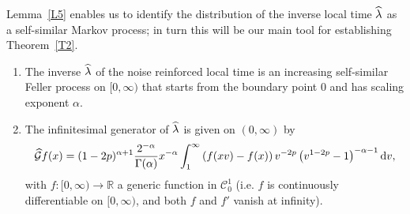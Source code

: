 \documentclass[10pt]{amsart}
\theoremstyle{definition}\newtheorem{defi}[theo]{Definition}\newtheorem{rema}[theo]{Remark}\newtheorem{exam}[theo]{Example}\newtheorem{exem}[theo]{Example}\newtheorem{nota}[theo]{Notation}
\renewcommand{\hat}[1]{\widehat{#1}}
\newcommand{\dd}{\mathrm{d}}
\newcommand{\R}{\mathbb{R}}
\newcommand{\calC}{\mathcal{C}}
\newcommand{\calG}{\mathcal{G}}
\newcommand*{\romanenumi}{\renewcommand*{\theenumi}{\roman{enumi}}}
\let\oldhat\hat
\renewcommand*{\hat}[1]{\mathchoice{\widehat{#1}}{\widehat{#1}}{\oldhat{#1}}{\oldhat{#1}}}
\begin{document}
Lemma~\ref{L5} enables us to identify the distribution of the inverse local time $\hat \lambda$ as a self-similar Markov process; in turn this will be our main tool for establishing Theorem~\ref{T2}.

\begin{coro}\label{C1}\leavevmode
\begin{enumerate}\romanenumi
\item\label{coro4.2.i} The inverse $\hat \lambda$ of the noise reinforced local time is an increasing self-similar Feller process on $[0,\infty)$ that starts from the boundary point $0$ and has scaling exponent $\alpha$.

\item\label{coro4.2.ii} The infinitesimal generator of $\hat \lambda$ is given on $(0,\infty)$ by
\[
\hat{\calG}f(x) = (1-2p)^{\alpha+1} \frac{2^{-\alpha}}{\Gamma(\alpha)} x^{-\alpha} \int_1^{\infty} \left(f(x v)-f(x)\right) v^{-2p} \left(v^{1-2p}-1\right)^{-\alpha - 1} \dd v,
\]
with $f:[0,\infty)\to \R$ a generic function in $\calC^1_0$ (i.e. $f$ is continuously differentiable on $[0,\infty)$, and both $f$ and $f'$ vanish at infinity).
\end{enumerate}
\end{coro}
\end{document}
